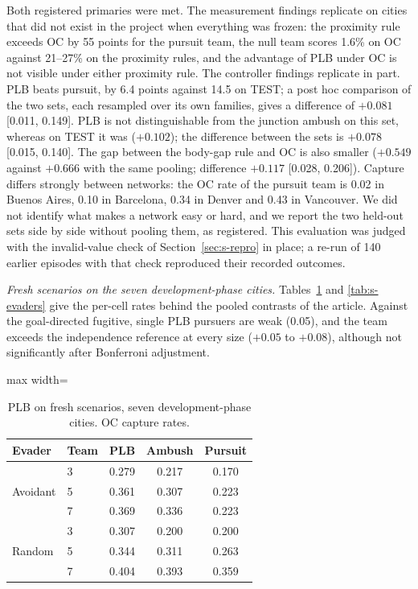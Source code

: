 \documentclass[preprint,12pt]{elsarticle}
\begin{document}
Both registered primaries were met. The measurement findings replicate on cities that did not exist in the project
when everything was frozen: the proximity rule exceeds OC by 55 points for the pursuit team, the null team scores
1.6\% on OC against 21--27\% on the proximity rules, and the advantage of PLB under OC is not visible under either
proximity rule. The controller findings replicate in part. PLB beats pursuit, by 6.4 points against 14.5 on TEST; a
post hoc comparison of the two sets, each resampled over its own families, gives a difference of $+0.081$
[0.011, 0.149]. PLB is not distinguishable from the junction ambush on this set, whereas on TEST it was ($+0.102$);
the difference between the sets is $+0.078$ [0.015, 0.140]. The gap between the body-gap rule and OC is also smaller
($+0.549$ against $+0.666$ with the same pooling; difference $+0.117$ [0.028, 0.206]). Capture differs strongly
between networks: the OC rate of the pursuit team is 0.02 in Buenos Aires, 0.10 in Barcelona, 0.34 in Denver and
0.43 in Vancouver. We did not identify what makes a network easy or hard, and we report the two held-out sets side
by side without pooling them, as registered. This evaluation was judged with the invalid-value check of
Section~\ref{sec:s-repro} in place; a re-run of 140 earlier episodes with that check reproduced their recorded
outcomes.

\emph{Fresh scenarios on the seven development-phase cities.} Tables~\ref{tab:s-plb} and \ref{tab:s-evaders} give the
per-cell rates behind the pooled contrasts of the article. Against the goal-directed fugitive, single PLB pursuers are
weak (0.05), and the team exceeds the independence reference at every size ($+0.05$ to $+0.08$), although not
significantly after Bonferroni adjustment.

\begin{table}[!h]
\centering
\caption{PLB on fresh scenarios, seven development-phase cities. OC capture rates.}
\label{tab:s-plb}
\begin{adjustbox}{max width=\textwidth}
\begin{tabular}{@{}llccc@{}}
\toprule
Evader & Team & PLB & Ambush & Pursuit \\
\midrule
\multirow{3}{*}{Avoidant} & 3 & 0.279 & 0.217 & 0.170 \\
& 5 & 0.361 & 0.307 & 0.223 \\
& 7 & 0.369 & 0.336 & 0.223 \\
\midrule
\multirow{3}{*}{Random} & 3 & 0.307 & 0.200 & 0.200 \\
& 5 & 0.344 & 0.311 & 0.263 \\
& 7 & 0.404 & 0.393 & 0.359 \\
\bottomrule
\end{tabular}
\end{adjustbox}
\end{table}
\end{document}
